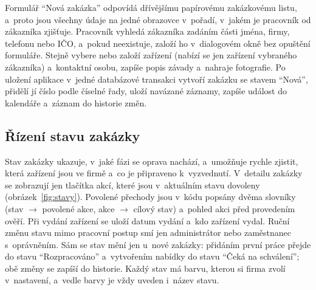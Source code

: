 Formulář \enquote{Nová zakázka} odpovídá dřívějšímu papírovému zakázkovému listu, a~proto jsou všechny údaje na jedné obrazovce v~pořadí, v~jakém je pracovník od zákazníka zjišťuje. Pracovník vyhledá zákazníka zadáním části jména, firmy, telefonu nebo IČO, a~pokud neexistuje, založí ho v~dialogovém okně bez opuštění formuláře. Stejně vybere nebo založí zařízení (nabízí se jen zařízení vybraného zákazníka) a~kontaktní osobu, zapíše popis závady a~nahraje fotografie. Po uložení aplikace v~jedné databázové transakci vytvoří zakázku se stavem \enquote{Nová}, přidělí jí číslo podle číselné řady, uloží navázané záznamy, zapíše událost do kalendáře a~záznam do historie změn.

\subsection{Řízení stavu zakázky}

Stav zakázky ukazuje, v~jaké fázi se oprava nachází, a~umožňuje rychle zjistit, která zařízení jsou ve firmě a~co je připraveno k~vyzvednutí. V~detailu zakázky se zobrazují jen tlačítka akcí, které jsou v~aktuálním stavu dovoleny (obrázek~\ref{fig:stavy}). Povolené přechody jsou v~kódu popsány dvěma slovníky (stav $\rightarrow$ povolené akce, akce $\rightarrow$ cílový stav) a~pohled akci před provedením ověří. Při vydání zařízení se uloží datum vydání a~kdo zařízení vydal. Ruční změnu stavu mimo pracovní postup smí jen administrátor nebo zaměstnanec s~oprávněním. Sám se stav mění jen u~nové zakázky: přidáním první práce přejde do stavu \enquote{Rozpracováno} a~vytvořením nabídky do stavu \enquote{Čeká na schválení}; obě změny se zapíší do historie. Každý stav má barvu, kterou si firma zvolí v~nastavení, a~vedle barvy je vždy uveden i~název stavu.

